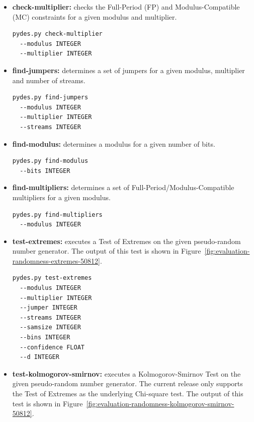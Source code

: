 \begin{itemize}
	\item \textbf{check-multiplier:} checks the Full-Period (FP) and Modulus-Compatible (MC) constraints for a given modulus and multiplier.
	\begin{lstlisting}[basicstyle=\tiny]
pydes.py check-multiplier 
  --modulus INTEGER 
  --multiplier INTEGER
	\end{lstlisting}
	
	\item \textbf{find-jumpers:} determines a set of jumpers for a given modulus, multiplier and number of streams.
	\begin{lstlisting}[basicstyle=\tiny]
pydes.py find-jumpers
  --modulus INTEGER 
  --multiplier INTEGER
  --streams INTEGER
	\end{lstlisting}
	
	\item \textbf{find-modulus:} determines a modulus for a given number of bits.
	\begin{lstlisting}[basicstyle=\tiny]
pydes.py find-modulus
  --bits INTEGER
	\end{lstlisting}
	
	\item \textbf{find-multipliers:} determines a set of Full-Period/Modulus-Compatible multipliers for a given modulus.
	\begin{lstlisting}[basicstyle=\tiny]
pydes.py find-multipliers
  --modulus INTEGER
	\end{lstlisting}
	
	\item \textbf{test-extremes:} executes a Test of Extremes \cite{leemis2006discrete} on the given pseudo-random number generator. The output of this test is shown in Figure~\ref{fig:evaluation-randomness-extremes-50812}.
	\begin{lstlisting}[basicstyle=\tiny]
pydes.py test-extremes
  --modulus INTEGER
  --multiplier INTEGER
  --jumper INTEGER
  --streams INTEGER
  --samsize INTEGER 
  --bins INTEGER 
  --confidence FLOAT
  --d INTEGER
	\end{lstlisting}

	\item \textbf{test-kolmogorov-smirnov:} executes a Kolmogorov-Smirnov Test \cite{leemis2006discrete} on the given pseudo-random number generator. The current release only supports the Test of Extremes as the underlying Chi-square test. The output of this test is shown in Figure~\ref{fig:evaluation-randomness-kolmogorov-smirnov-50812}.
	

\end{itemize}
